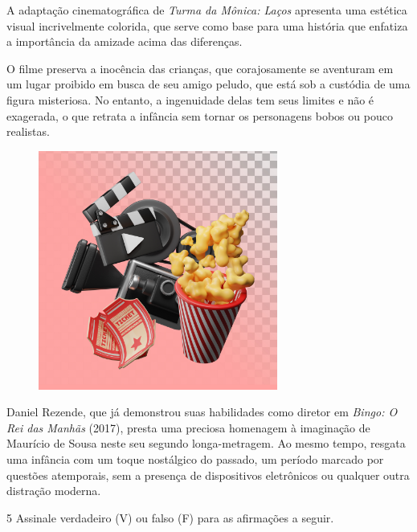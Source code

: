 \begin{myquote}
A adaptação cinematográfica de \emph{Turma da Mônica: Laços} apresenta
uma estética visual incrivelmente colorida, que serve como base para uma
história que enfatiza a importância da amizade acima das diferenças.

O filme preserva a inocência das crianças, que corajosamente se
aventuram em um lugar proibido em busca de seu amigo peludo, que está
sob a custódia de uma figura misteriosa. No entanto, a ingenuidade delas
tem seus limites e não é exagerada, o que retrata a infância sem tornar
os personagens bobos ou pouco realistas.

\begin{figure}[H]
\centering\includegraphics[width=0.7\textwidth]{./imgSAEB_6_POR/freepik/PORT_6_IMG-3.jpeg}
\end{figure}

Daniel Rezende, que já demonstrou suas habilidades como diretor em
\emph{Bingo: O Rei das Manhãs} (2017), presta uma preciosa homenagem à
imaginação de Maurício de Sousa neste seu segundo longa-metragem. Ao
mesmo tempo, resgata uma infância com um toque nostálgico do passado, um
período marcado por questões atemporais, sem a presença de dispositivos
eletrônicos ou qualquer outra distração moderna.

\end{myquote}


\pagebreak

\num{5} Assinale verdadeiro (V) ou falso (F) para as afirmações a
seguir.

